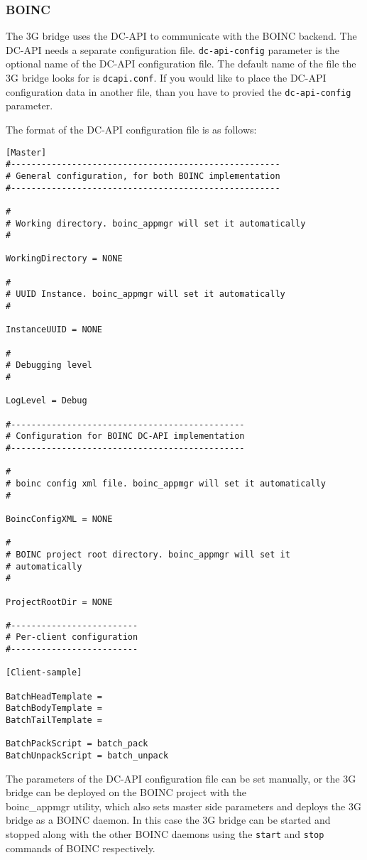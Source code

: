 \documentclass[a4paper, 12pt]{article}
\begin{document}
\subsubsection{BOINC}
\label{subsec:boinc}
The 3G bridge uses the DC-API to communicate with the BOINC backend. The DC-API needs a separate configuration file. {\tt dc-api-config} parameter is the optional name of the DC-API configuration file. The default name of the file the 3G bridge looks for is {\tt dcapi.conf}. If you would like to place the DC-API configuration data in  another file, than you have to provied the {\tt dc-api-config} parameter. 

The format of the DC-API configuration file is as follows:

\begin{verbatim}
[Master]
#-----------------------------------------------------
# General configuration, for both BOINC implementation
#-----------------------------------------------------

#
# Working directory. boinc_appmgr will set it automatically
#

WorkingDirectory = NONE

#
# UUID Instance. boinc_appmgr will set it automatically
#

InstanceUUID = NONE

#
# Debugging level
#

LogLevel = Debug

#----------------------------------------------
# Configuration for BOINC DC-API implementation
#----------------------------------------------

#
# boinc config xml file. boinc_appmgr will set it automatically
#

BoincConfigXML = NONE

#
# BOINC project root directory. boinc_appmgr will set it 
# automatically
#

ProjectRootDir = NONE

#-------------------------
# Per-client configuration
#-------------------------

[Client-sample]

BatchHeadTemplate =
BatchBodyTemplate =
BatchTailTemplate =

BatchPackScript = batch_pack
BatchUnpackScript = batch_unpack
\end{verbatim}
The parameters of the DC-API configuration file can be set manually, or the 3G bridge can be deployed on the BOINC project with the \\ boinc\_appmgr utility, which also sets master side parameters and deploys the 3G bridge as a BOINC daemon. In this case the 3G bridge can be started and stopped along with the other BOINC daemons using the {\tt start} and {\tt stop} commands of BOINC respectively. 
\end{document}
